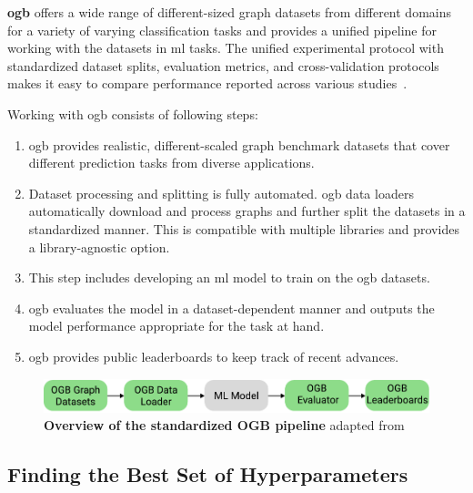 \textbf{\Ac{ogb}} offers a wide range of different-sized graph datasets from different domains for a variety of varying classification tasks and provides a unified pipeline for working with the datasets in \ac{ml} tasks.
The unified experimental protocol with standardized dataset splits, evaluation metrics, and cross-validation protocols makes it easy to compare performance reported across various studies~\cite{Hu2020}.

Working with \ac{ogb} consists of following steps:

\begin{enumerate}
    \item \Ac{ogb} provides realistic, different-scaled graph benchmark datasets that cover different prediction tasks from diverse applications.
    \item Dataset processing and splitting is fully automated. \Ac{ogb} data loaders automatically download and process graphs and further split the datasets in a standardized manner. This is compatible with multiple libraries and provides a library-agnostic option.
    \item This step includes developing an \ac{ml} model to train on the \ac{ogb} datasets.
    \item  \Ac{ogb} evaluates the model in a dataset-dependent manner and outputs the model performance appropriate for the task at hand.
    \item \Ac{ogb} provides public leaderboards to keep track of recent advances.
\end{enumerate}

\begin{figure}[H]
    \centering
    \includegraphics[width= 0.90\linewidth]{gfx/implementation/OGB_pipeline}
    \caption{\textbf{Overview of the standardized OGB pipeline} adapted from \cite{Hu2020}}\label{fig:implement:pipeline}
\end{figure}

\subsection{Finding the Best Set of Hyperparameters}
\label{sec:implement:setup: gridsearch}


